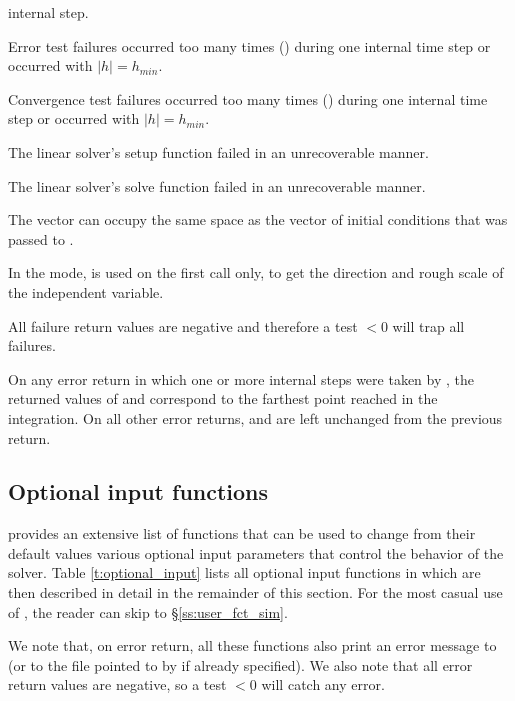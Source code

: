 {\begin{args}
    internal step.
  \item[\Id{CV\_ERR\_FAILURE}]
    Error test failures occurred too many times () during one 
    internal time step or occurred with $|h| = h_{min}$.
  \item[\Id{CV\_CONV\_FAILURE}] 
    Convergence test failures occurred too many times () during 
    one internal time step or occurred with $|h| = h_{min}$.             
  \item[\Id{CV\_LSETUP\_FAIL}] 
    The linear solver's setup function failed in an unrecoverable manner.
  \item[\Id{CV\_LSOLVE\_FAIL}] 
    The linear solver's solve function failed in an unrecoverable manner.
  \end{args} 
}
{
  The vector  can occupy the same space as the  vector of 
  initial conditions that was passed to . 

  In the  mode,  is used on the first call only, 
  to get the direction and rough scale of the independent variable.

  All failure return values are negative and therefore a test $< 0$
  will trap all  failures.

  On any error return in which one or more internal steps were taken by
  , the returned values of  and  correspond to
  the farthest point reached in the integration.  On all other error returns,
   and  are left unchanged from the previous 
  return.
}

\subsection{Optional input functions}\label{ss:optional_input}

{\cvode} provides an extensive list of functions that can be used to change
from their default values various optional input parameters that control the
behavior of the {\cvode} solver. 
Table \ref{t:optional_input} lists all optional input functions in {\cvode} which 
are then described in detail in the remainder of this section.
For the most casual use of {\cvode}, the reader can skip to \S\ref{ss:user_fct_sim}.

We note that, on error return, all these functions also print an error message
to  (or to the file pointed to by  if already specified).
We also note that all error return values are negative, so a test $<0$
will catch any error.


